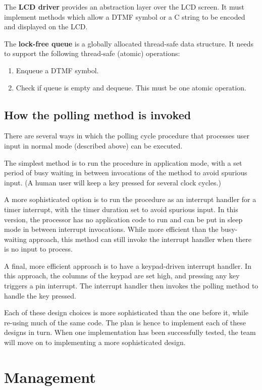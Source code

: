 \documentclass[11pt,a4paper,twocolumn]{scrartcl}
\begin{document}
The \textbf{LCD driver} provides an abstraction layer over the LCD screen. It must implement methods which allow a DTMF symbol or a C string to be encoded and
displayed on the LCD.

The \textbf{lock-free queue} is a globally allocated thread-safe data structure. It needs to support the following thread-safe (atomic) operations:
\begin{enumerate}
   \item Enqueue a DTMF symbol.
   \item Check if queue is empty and dequeue. This must be one atomic operation.
\end{enumerate}

\subsection{How the polling method is invoked} \label{polling-method}

There are several ways in which the polling cycle procedure that processes user input in normal mode (described above) can be executed.

The simplest method is to run the procedure in application mode, with a set period of busy waiting in between invocations of the method to avoid spurious input.
(A human user will keep a key pressed for several clock cycles.)

A more sophisticated option is to run the procedure as an interrupt handler for a timer interrupt, with the timer duration set to avoid spurious input. In this
version, the processor has no application code to run and can be put in sleep mode in between interrupt invocations. While more efficient than the busy-waiting
approach, this method can still invoke the interrupt handler when there is no input to process.

A final, more efficient approach is to have a keypad-driven interrupt handler. In this approach, the columns of the keypad are set high, and pressing any key
triggers a pin interrupt. The interrupt handler then invokes the polling method to handle the key pressed.

Each of these design choices is more sophisticated than the one before it, while re-using much of the same code. 
The plan is hence to implement each of these designs in turn. When one implementation has been successfully tested, the team will move on to implementing a more
sophisticated design.

\section{Management} \label{schedule}
\end{document}
